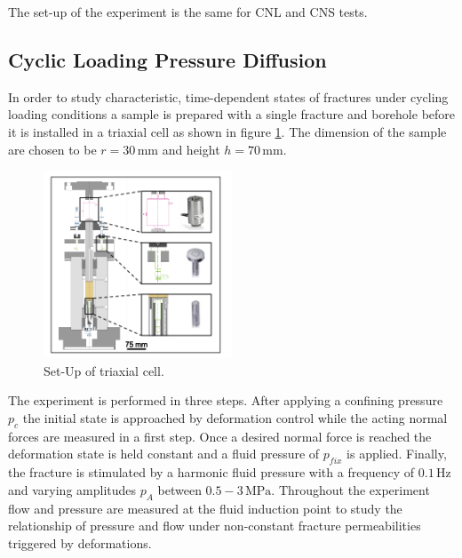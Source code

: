 The set-up of the experiment is the same for CNL and CNS tests. 


\subsection{Cyclic Loading Pressure Diffusion}
In order to study characteristic, time-dependent states of fractures under cycling loading conditions a sample is prepared with a single fracture and borehole before it is installed in a triaxial cell as shown in figure \ref{fig:exp_cyclic_pressure_triax}. The dimension of the sample are chosen to be $r = 30 \, \text{mm}$ and height $h = 70 \, \text{mm}$. 
\begin{figure}[!ht]
\begin{center}
\includegraphics[width=0.5\textwidth]{./figures/exp_cyclic_pressure_triax.png}
\end{center}
\caption{Set-Up of triaxial cell.}
\label{fig:exp_cyclic_pressure_triax}
\end{figure}
The experiment is performed in three steps. After applying a confining pressure $p_{c}$ the initial state is approached by deformation control while the acting normal forces are measured in a first step. Once a desired normal force is reached the deformation state is held constant and a fluid pressure of $p_{fix}$ is applied. Finally, the fracture is stimulated by a harmonic fluid pressure with a frequency of $0.1 \, \text{Hz}$ and varying amplitudes $p_A$ between $0.5-3 \, \text{MPa}$. Throughout the experiment flow and pressure are measured at the fluid induction point to study the relationship of pressure and flow under non-constant fracture permeabilities triggered by deformations.